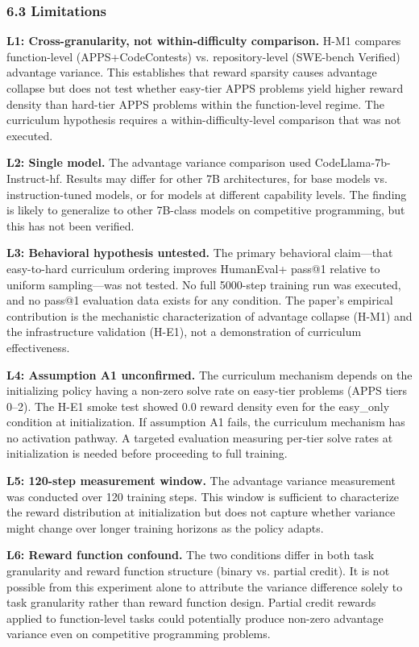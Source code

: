 \subsubsection{6.3 Limitations}

\textbf{L1: Cross-granularity, not within-difficulty comparison.} H-M1 compares function-level (APPS+CodeContests) vs. repository-level (SWE-bench Verified) advantage variance. This establishes that reward sparsity causes advantage collapse but does not test whether easy-tier APPS problems yield higher reward density than hard-tier APPS problems within the function-level regime. The curriculum hypothesis requires a within-difficulty-level comparison that was not executed.

\textbf{L2: Single model.} The advantage variance comparison used CodeLlama-7b-Instruct-hf. Results may differ for other 7B architectures, for base models vs. instruction-tuned models, or for models at different capability levels. The finding is likely to generalize to other 7B-class models on competitive programming, but this has not been verified.

\textbf{L3: Behavioral hypothesis untested.} The primary behavioral claim—that easy-to-hard curriculum ordering improves HumanEval+ pass@1 relative to uniform sampling—was not tested. No full 5000-step training run was executed, and no pass@1 evaluation data exists for any condition. The paper's empirical contribution is the mechanistic characterization of advantage collapse (H-M1) and the infrastructure validation (H-E1), not a demonstration of curriculum effectiveness.

\textbf{L4: Assumption A1 unconfirmed.} The curriculum mechanism depends on the initializing policy having a non-zero solve rate on easy-tier problems (APPS tiers 0–2). The H-E1 smoke test showed 0.0 reward density even for the easy_only condition at initialization. If assumption A1 fails, the curriculum mechanism has no activation pathway. A targeted evaluation measuring per-tier solve rates at initialization is needed before proceeding to full training.

\textbf{L5: 120-step measurement window.} The advantage variance measurement was conducted over 120 training steps. This window is sufficient to characterize the reward distribution at initialization but does not capture whether variance might change over longer training horizons as the policy adapts.

\textbf{L6: Reward function confound.} The two conditions differ in both task granularity and reward function structure (binary vs. partial credit). It is not possible from this experiment alone to attribute the variance difference solely to task granularity rather than reward function design. Partial credit rewards applied to function-level tasks could potentially produce non-zero advantage variance even on competitive programming problems.

